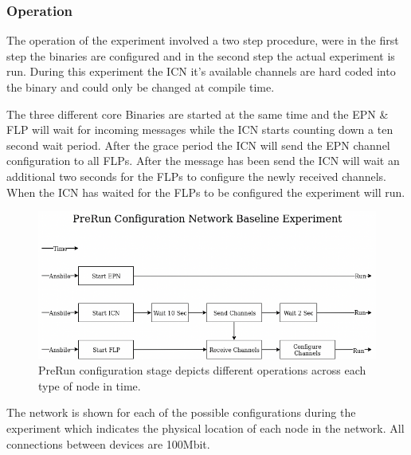 \documentclass[]{article}
\begin{document}
\subsubsection{Operation}
The operation of the experiment involved a two step procedure, were in the first step the binaries are configured and in the second step the actual experiment is run. During this experiment the ICN it’s available channels are hard coded into the binary and could only be changed at compile time. 

The three different core Binaries are started at the same time and the EPN \& FLP will wait for incoming messages while the ICN starts counting down a ten second wait period. After the grace period the ICN will send the EPN channel configuration to all FLPs. After the message has been send the ICN will wait an additional two seconds for the FLPs to configure the newly received channels. When the ICN has waited for the FLPs to be configured the experiment will run.

\begin{center}
	\begin{figure}[H]
		\includegraphics[width=\textwidth]{images/no-zookeeper-flow-n-base-exp}
		\caption{PreRun configuration stage depicts different operations across each type of node in time.}
		\label{fig:ssh}
	\end{figure}
\end{center}

The network is shown for each of the possible configurations during the experiment which indicates the physical location of each node in the network. All connections between devices are 100Mbit.
\end{document}
